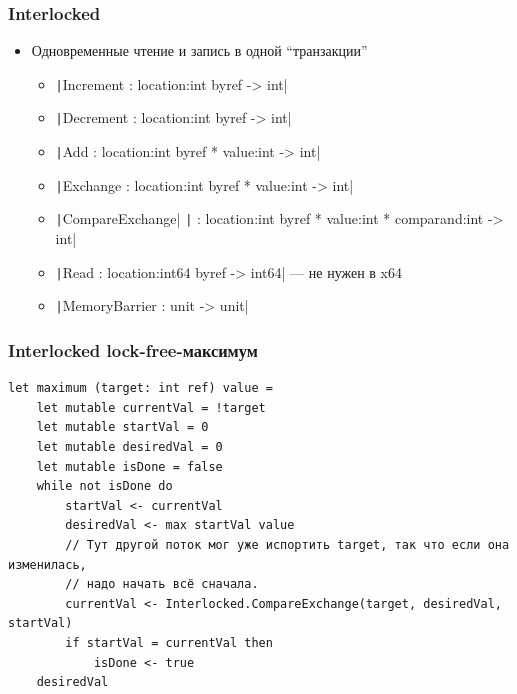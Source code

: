 \documentclass[xetex,mathserif,serif]{beamer}
\begin{document}
    \begin{frame}
        \frametitle{Interlocked}
        \begin{itemize}
            \item Одновременные чтение и запись в одной ``транзакции''
            \begin{itemize}
                \item \texttt|Increment : location:int byref -> int|
                \item \texttt|Decrement : location:int byref -> int|
                \item \texttt|Add : location:int byref * value:int -> int|
                \item \texttt|Exchange : location:int byref * value:int -> int|
                \item \texttt|CompareExchange|
                        \texttt|        : location:int byref * value:int * comparand:int -> int|
                \item \texttt|Read : location:int64 byref -> int64| --- не нужен в x64
                \item \texttt|MemoryBarrier : unit -> unit|
            \end{itemize}
        \end{itemize}
    \end{frame}

    \begin{frame}[fragile]
        \frametitle{Interlocked lock-free-максимум}
        \begin{footnotesize}
            \begin{verbatim}
let maximum (target: int ref) value =
    let mutable currentVal = !target
    let mutable startVal = 0
    let mutable desiredVal = 0
    let mutable isDone = false
    while not isDone do
        startVal <- currentVal
        desiredVal <- max startVal value
        // Тут другой поток мог уже испортить target, так что если она изменилась,
        // надо начать всё сначала.
        currentVal <- Interlocked.CompareExchange(target, desiredVal, startVal)
        if startVal = currentVal then
            isDone <- true
    desiredVal
            \end{verbatim}
        \end{footnotesize}
    \end{frame}
\end{document}
